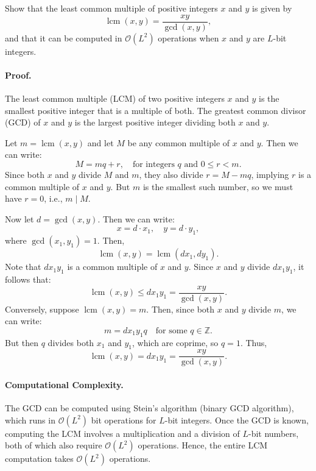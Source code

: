 \begin{example}
    Show that the least common multiple of positive integers $x$ and $y$ is given by
    \[
    \operatorname{lcm}(x, y) = \frac{xy}{\gcd(x, y)},
    \]
    and that it can be computed in $\mathcal{O}(L^2)$ operations when $x$ and $y$ are $L$-bit integers.

    \paragraph{Proof.} 
    The least common multiple (LCM) of two positive integers $x$ and $y$ is the smallest positive integer that is a multiple of both. The greatest common divisor (GCD) of $x$ and $y$ is the largest positive integer dividing both $x$ and $y$.

    Let $m = \operatorname{lcm}(x, y)$ and let $M$ be any common multiple of $x$ and $y$. Then we can write:
    \[
    M = mq + r, \quad \text{for integers } q \text{ and } 0 \le r < m.
    \]
    Since both $x$ and $y$ divide $M$ and $m$, they also divide $r = M - mq$, implying $r$ is a common multiple of $x$ and $y$. But $m$ is the smallest such number, so we must have $r = 0$, i.e., $m \mid M$.

    Now let $d = \gcd(x, y)$. Then we can write:
    \[
    x = d \cdot x_1, \quad y = d \cdot y_1,
    \]
    where $\gcd(x_1, y_1) = 1$. Then,
    \[
    \operatorname{lcm}(x, y) = \operatorname{lcm}(d x_1, d y_1).
    \]
    Note that $d x_1 y_1$ is a common multiple of $x$ and $y$. Since $x$ and $y$ divide $d x_1 y_1$, it follows that:
    \[
    \operatorname{lcm}(x, y) \le d x_1 y_1 = \frac{xy}{\gcd(x, y)}.
    \]
    Conversely, suppose $\operatorname{lcm}(x, y) = m$. Then, since both $x$ and $y$ divide $m$, we can write:
    \[
    m = d x_1 y_1 q \quad \text{for some } q \in \mathbb{Z}.
    \]
    But then $q$ divides both $x_1$ and $y_1$, which are coprime, so $q = 1$. Thus,
    \[
    \operatorname{lcm}(x, y) = d x_1 y_1 = \frac{xy}{\gcd(x, y)}.
    \]

    \paragraph{Computational Complexity.} 
    The GCD can be computed using Stein's algorithm (binary GCD algorithm), which runs in $\mathcal{O}(L^2)$ bit operations for $L$-bit integers. Once the GCD is known, computing the LCM involves a multiplication and a division of $L$-bit numbers, both of which also require $\mathcal{O}(L^2)$ operations. Hence, the entire LCM computation takes $\mathcal{O}(L^2)$ operations.
\end{example}


